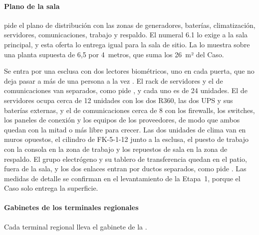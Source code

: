 \paragraph{Plano de la sala}  pide el plano de distribución con las zonas de
generadores, baterías, climatización, servidores, comunicaciones, trabajo y respaldo. El numeral 6.1 lo
exige a la sala principal, y esta oferta lo entrega igual para la sala de sitio. La
 lo muestra sobre una planta supuesta de 6,5 por 4~metros, que suma los 26~m²
del Caso.


Se entra por una esclusa con dos lectores biométricos, uno en cada puerta, que no deja pasar a más de
una persona a la vez . El rack de servidores y el de comunicaciones van separados,
como pide , y cada uno es de 24 unidades. El de servidores ocupa cerca de 12
unidades con los dos R360, las dos UPS y sus baterías externas, y el de comunicaciones cerca de 8 con
los firewalls, los switches, los paneles de conexión y los equipos de los proveedores, de modo que ambos
quedan con la mitad o más libre para crecer. Las dos unidades de clima van en muros opuestos, el cilindro
de FK-5-1-12 junto a la esclusa, el puesto de trabajo con la consola en la zona de trabajo y los
repuestos de sala en la zona de respaldo. El grupo electrógeno y su tablero de transferencia quedan en
el patio, fuera de la sala, y los dos enlaces entran por ductos separados, como pide
. Las medidas de detalle se confirman en el levantamiento de la Etapa~1, porque el
Caso solo entrega la superficie.

\paragraph{Gabinetes de los terminales regionales} Cada terminal regional lleva el gabinete de la
.


